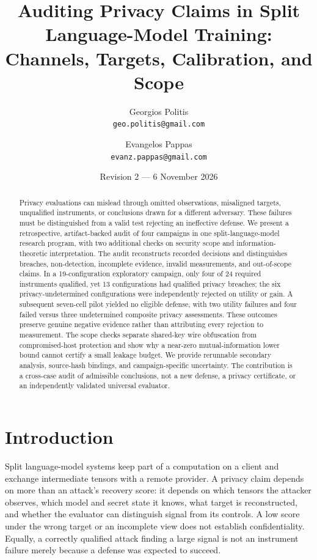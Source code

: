 \documentclass[11pt]{article}
\title{Auditing Privacy Claims in Split Language-Model Training:\\
Channels, Targets, Calibration, and Scope}
\author{Georgios Politis\\{\small\texttt{geo.politis@gmail.com}}
\and Evangelos Pappas\\{\small\texttt{evanz.pappas@gmail.com}}}
\date{Revision 2 --- 6 November 2026}
\begin{document}
\maketitle
\begin{abstract}
Privacy evaluations can mislead through omitted observations, misaligned
targets, unqualified instruments, or conclusions drawn for a different
adversary. These failures must be distinguished from a valid test rejecting
an ineffective defense. We present a retrospective, artifact-backed audit
of four campaigns in one split-language-model research program, with two
additional checks on security scope and information-theoretic interpretation.
The audit reconstructs recorded decisions and distinguishes breaches,
non-detection, incomplete evidence, invalid measurements, and out-of-scope
claims. In a 19-configuration exploratory campaign, only four of 24
required instruments qualified, yet 13 configurations had qualified privacy
breaches; the six privacy-undetermined configurations were independently
rejected on utility or gain. A subsequent seven-cell pilot yielded no
eligible defense, with two utility failures and four failed versus three
undetermined composite privacy assessments. These outcomes preserve genuine
negative evidence rather than attributing every rejection to measurement.
The scope checks separate shared-key wire obfuscation from compromised-host
protection and show why a near-zero mutual-information lower bound cannot
certify a small leakage budget. We provide rerunnable secondary analysis,
source-hash bindings, and campaign-specific uncertainty. The contribution
is a cross-case audit of admissible conclusions, not a new defense, a
privacy certificate, or an independently validated universal evaluator.
\end{abstract}

\section{Introduction}
\label{sec:intro}

Split language-model systems keep part of a computation on a client and
exchange intermediate tensors with a remote provider. A privacy claim
depends on more than an attack's recovery score: it depends on which
tensors the attacker observes, which model and secret state it knows,
what target is reconstructed, and whether the evaluator can distinguish
signal from its controls. A low score under the wrong target or an
incomplete view does not establish confidentiality. Equally, a correctly
qualified attack finding a large signal is not an instrument failure merely
because a defense was expected to succeed.
\end{document}
